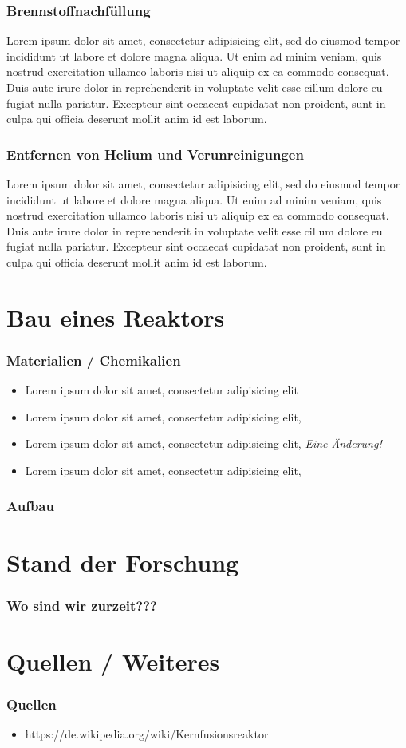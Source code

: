\documentclass[aspectratio=169]{beamer}
\begin{document}
    \begin{frame}
      \frametitle{Brennstoffnachfüllung}
      Lorem ipsum dolor sit amet, consectetur adipisicing elit, sed do eiusmod tempor incididunt ut labore et dolore magna aliqua. Ut enim ad minim veniam, quis nostrud exercitation ullamco laboris nisi ut aliquip ex ea commodo consequat. Duis aute irure dolor in reprehenderit in voluptate velit esse cillum dolore eu fugiat nulla pariatur. Excepteur sint occaecat cupidatat non proident, sunt in culpa qui officia deserunt mollit anim id est laborum.
    \end{frame}

    \begin{frame}
      \frametitle{Entfernen von Helium und Verunreinigungen}
      Lorem ipsum dolor sit amet, consectetur adipisicing elit, sed do eiusmod tempor incididunt ut labore et dolore magna aliqua. Ut enim ad minim veniam, quis nostrud exercitation ullamco laboris nisi ut aliquip ex ea commodo consequat. Duis aute irure dolor in reprehenderit in voluptate velit esse cillum dolore eu fugiat nulla pariatur. Excepteur sint occaecat cupidatat non proident, sunt in culpa qui officia deserunt mollit anim id est laborum.
    \end{frame}

  \section{Bau eines Reaktors}

    \begin{frame}
      \frametitle{Materialien / Chemikalien}
      \begin{itemize}
        \item Lorem ipsum dolor sit amet, consectetur adipisicing elit
        \item Lorem ipsum dolor sit amet, consectetur adipisicing elit,
        \item Lorem ipsum dolor sit amet, consectetur adipisicing elit, \textit{Eine Änderung!}
        \item Lorem ipsum dolor sit amet, consectetur adipisicing elit,
      \end{itemize}
    \end{frame}

    \begin{frame}
      \frametitle{Aufbau}
    \end{frame}

  \section{Stand der Forschung}

  \begin{frame}
    \frametitle{Wo sind wir zurzeit???}
  \end{frame}

  \section{Quellen / Weiteres}

    \begin{frame}
      \frametitle{Quellen}
      \begin{itemize}
        \item https://de.wikipedia.org/wiki/Kernfusionsreaktor
      \end{itemize}
    \end{frame}
\end{document}
